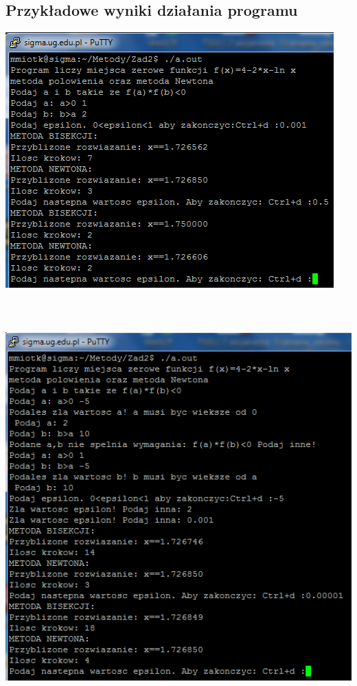 \documentclass[11pt]{article} %
\begin{document}
\subsection{Przykładowe wyniki działania programu}
\includegraphics{rozw1.png}\\\\\\\\
\includegraphics{rozw2.png}
\end{document}
